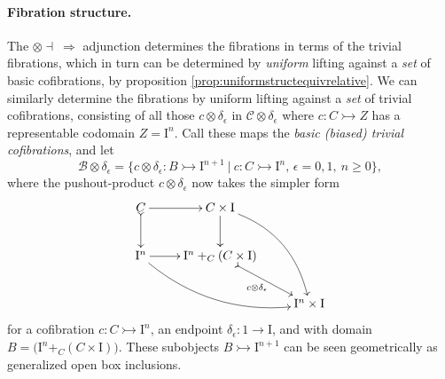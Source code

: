 \documentclass[11pt]{article}
\newcommand{\mono}{\ensuremath{\rightarrowtail}}
\newcommand{\I}{\ensuremath{\mathrm{I}}}
\theoremstyle{remark}
\theoremstyle{definition}
\begin{document}
\paragraph{Fibration structure.}
The $\otimes\dashv\ \Rightarrow$ adjunction determines the fibrations in terms of the trivial fibrations, which in turn can be determined by \emph{uniform} lifting against a \emph{set} of basic cofibrations, by proposition \ref{prop:uniformstructequivrelative}.  We can similarly determine the fibrations by uniform lifting against a \emph{set} of trivial cofibrations, consisting of all those $c \otimes \delta_\epsilon$ in $\mathcal{C}\otimes \delta_\epsilon$ where $c : C \mono Z$ has a representable codomain $Z=\I^n$.  
Call these maps the \emph{basic (biased) trivial cofibrations}, and let 
\begin{equation}\label{eq:basictrivcof}
\mathcal{B}\otimes \delta_\epsilon = \{c \otimes \delta_\epsilon : B \mono \I^{n+1}\ |\ c : C\mono \I^n,\,\epsilon = 0,1,\ n\geq 0 \},
\end{equation}
where the pushout-product $c\otimes\delta_\epsilon$ now takes the simpler form
\begin{equation}\label{diagram:basicpushoutproduct}
\xymatrix{
C \ar@{>->}[d] \ar[r] & C\times \I \ar[d] \ar@/^4ex/ [rdd]\\
\I^{n} \ar@/_4ex/ [rrd] \ar[r] &  \I^n +_C (C\times\I) \ar@{>->}[rd]_{c \otimes \delta_\epsilon} \\
&& \I^{n}\times\I
}
\end{equation}
for a cofibration $c : C\mono \I^n$, an endpoint $\delta_\epsilon:1 \to \I$, and with domain $B = \big(\I^n +_C (C\times\I)\big)$.   These subobjects $B \mono \I^{n+1}$ can be seen geometrically as generalized open box inclusions.
\end{document}
